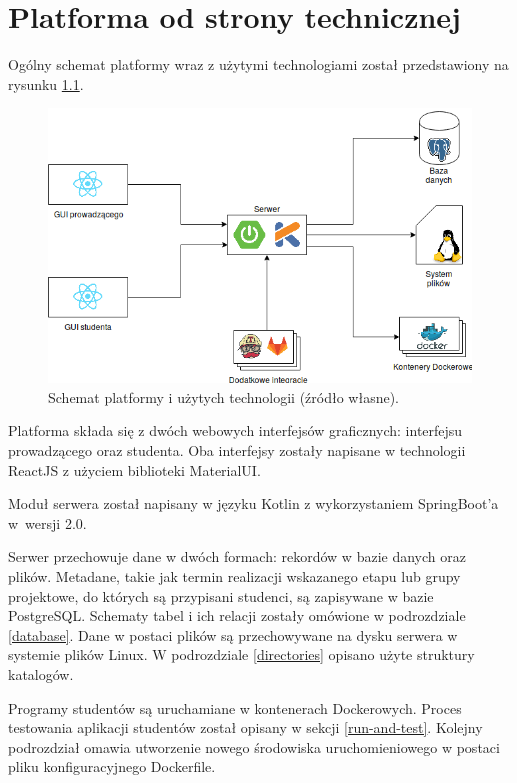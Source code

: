 \chapter{Platforma od strony technicznej}
\label{chapter:platform-technical}
Ogólny schemat platformy wraz z użytymi technologiami został przedstawiony na rysunku \ref{fig:platform-schema}.

\begin{figure}[h]
    \centering
    \includegraphics[width = 13cm]{chapter02/platform_schema.png}
    \caption{Schemat platformy i użytych technologii (źródło własne).}
    \label{fig:platform-schema}
\end{figure}

Platforma składa się z dwóch webowych interfejsów graficznych: interfejsu prowadzącego oraz studenta.
Oba interfejsy zostały napisane w technologii ReactJS z użyciem biblioteki MaterialUI.

Moduł serwera został napisany w języku Kotlin z wykorzystaniem SpringBoot’a w~wersji 2.0.

Serwer przechowuje dane w dwóch formach: rekordów w bazie danych oraz plików.
Metadane, takie jak termin realizacji wskazanego etapu lub grupy projektowe, do których są przypisani studenci, są zapisywane w bazie PostgreSQL.
Schematy tabel i ich relacji zostały omówione w podrozdziale \ref{database}.
Dane w postaci plików są przechowywane na dysku serwera w systemie plików Linux.
W podrozdziale \ref{directories} opisano użyte struktury katalogów.

Programy studentów są uruchamiane w kontenerach Dockerowych.
Proces testowania aplikacji studentów został opisany w sekcji \ref{run-and-test}.
Kolejny podrozdział omawia utworzenie nowego środowiska uruchomieniowego w postaci pliku konfiguracyjnego Dockerfile.

